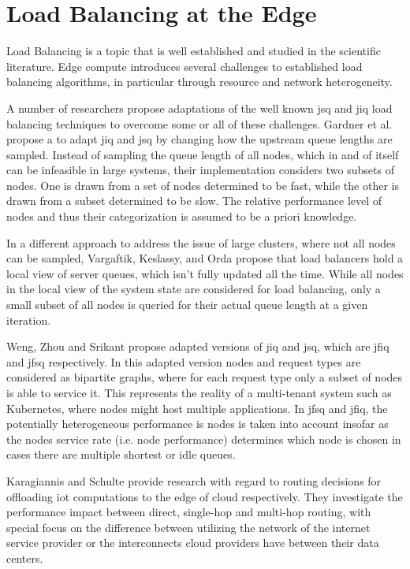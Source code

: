 \section{Load Balancing at the Edge}
Load Balancing is a topic that is well established and studied in the scientific literature.
Edge compute introduces several challenges to established load balancing algorithms, in particular through resource and network heterogeneity\cite{gardnerScalableLoadBalancing2021}.

A number of researchers propose adaptations of the well known \gls{jsq} and \gls{jiq} load balancing techniques to overcome some or all of these challenges\cite{gardnerScalableLoadBalancing2021}\cite{wengOptimalLoadBalancing2020}\cite{vargaftikLSQLoadBalancing2020}.
Gardner et al. propose a to adapt \gls{jiq} and \gls{jsq} by changing how the upstream queue lengths are sampled.
Instead of sampling the queue length of all nodes, which in and of itself can be infeasible in large systems\cite{gardnerScalableLoadBalancing2021}, their implementation considers two subsets of nodes.
One is drawn from a set of nodes determined to be fast, while the other is drawn from a subset determined to be slow.
The relative performance level of nodes and thus their categorization is assumed to be a priori knowledge.

In a different approach to address the issue of large clusters, where not all nodes can be sampled, Vargaftik, Keslassy, and Orda propose that load balancers hold a local view of server queues, which isn't fully updated all the time\cite{vargaftikLSQLoadBalancing2020}.
While all nodes in the local view of the system state are considered for load balancing, only a small subset of all nodes is queried for their actual queue length at a given iteration.

Weng, Zhou and Srikant propose adapted versions of \gls{jiq} and \gls{jsq}, which are \gls{jfiq} and \gls{jfsq} respectively.
In this adapted version nodes and request types are considered as bipartite graphs, where for each request type only a subset of nodes is able to service it.
This represents the reality of a multi-tenant system such as Kubernetes\cite{kubernetes}, where nodes might host multiple applications.
In \gls{jfsq} and \gls{jfiq}, the potentially heterogeneous performance is nodes is taken into account insofar as the nodes service rate (i.e. node performance) determines which node is chosen in cases there are multiple shortest or idle queues.

Karagiannis and Schulte provide research with regard to routing decisions for offloading \gls{iot} computations to the edge of cloud respectively\cite{karagiannisEdgeRoutingUsingCompute2021}.
They investigate the performance impact between direct, single-hop and multi-hop routing, with special focus on the difference between utilizing the network of the internet service provider or the interconnects cloud providers have between their data centers.


